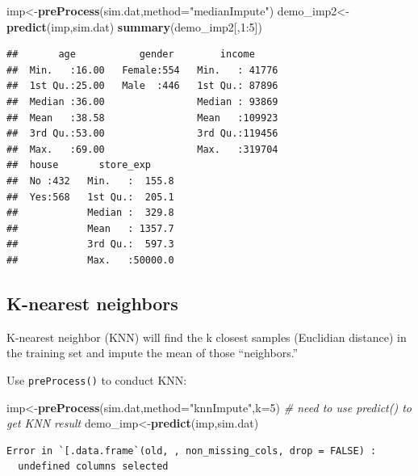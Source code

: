 \documentclass[12pt,]{krantz}
\newenvironment{Shaded}{\begin{snugshade}}{\end{snugshade}}
\newcommand{\KeywordTok}[1]{\textcolor[rgb]{0.13,0.29,0.53}{\textbf{{#1}}}}
\newcommand{\DataTypeTok}[1]{\textcolor[rgb]{0.13,0.29,0.53}{{#1}}}
\newcommand{\DecValTok}[1]{\textcolor[rgb]{0.00,0.00,0.81}{{#1}}}
\newcommand{\StringTok}[1]{\textcolor[rgb]{0.31,0.60,0.02}{{#1}}}
\newcommand{\CommentTok}[1]{\textcolor[rgb]{0.56,0.35,0.01}{\textit{{#1}}}}
\newcommand{\NormalTok}[1]{{#1}}
\theoremstyle{definition}
\theoremstyle{definition}
\theoremstyle{remark}
\begin{document}
\begin{Shaded}
\begin{Highlighting}[]
\NormalTok{imp<-}\KeywordTok{preProcess}\NormalTok{(sim.dat,}\DataTypeTok{method=}\StringTok{"medianImpute"}\NormalTok{)}
\NormalTok{demo_imp2<-}\KeywordTok{predict}\NormalTok{(imp,sim.dat)}
\KeywordTok{summary}\NormalTok{(demo_imp2[,}\DecValTok{1}\NormalTok{:}\DecValTok{5}\NormalTok{])}
\end{Highlighting}
\end{Shaded}

\begin{verbatim}
##       age           gender        income      
##  Min.   :16.00   Female:554   Min.   : 41776  
##  1st Qu.:25.00   Male  :446   1st Qu.: 87896  
##  Median :36.00                Median : 93869  
##  Mean   :38.58                Mean   :109923  
##  3rd Qu.:53.00                3rd Qu.:119456  
##  Max.   :69.00                Max.   :319704  
##  house       store_exp      
##  No :432   Min.   :  155.8  
##  Yes:568   1st Qu.:  205.1  
##            Median :  329.8  
##            Mean   : 1357.7  
##            3rd Qu.:  597.3  
##            Max.   :50000.0
\end{verbatim}

\subsection{K-nearest neighbors}\label{k-nearest-neighbors}

K-nearest neighbor (KNN) will find the k closest samples (Euclidian
distance) in the training set and impute the mean of those
``neighbors.''

Use \texttt{preProcess()} to conduct KNN:

\begin{Shaded}
\begin{Highlighting}[]
\NormalTok{imp<-}\KeywordTok{preProcess}\NormalTok{(sim.dat,}\DataTypeTok{method=}\StringTok{"knnImpute"}\NormalTok{,}\DataTypeTok{k=}\DecValTok{5}\NormalTok{)}
\CommentTok{# need to use predict() to get KNN result}
\NormalTok{demo_imp<-}\KeywordTok{predict}\NormalTok{(imp,sim.dat)}
\end{Highlighting}
\end{Shaded}

\begin{verbatim}
Error in `[.data.frame`(old, , non_missing_cols, drop = FALSE) : 
  undefined columns selected
\end{verbatim}
\end{document}
